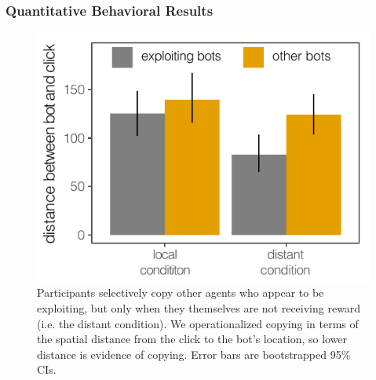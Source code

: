 \documentclass[12pt,letterpaper]{article}
\begin{document}
\subsubsection{Quantitative Behavioral Results}

\begin{figure}
    \centering
    \includegraphics[width=0.8 \linewidth]{figures/proximity.pdf}
    \vspace{-1em}
    \caption{Participants selectively copy other agents who appear to be exploiting, but only when they themselves are not receiving reward (i.e. the distant condition). We operationalized copying in terms of the spatial distance from the click to the bot's location, so lower distance is evidence of copying. Error bars are bootstrapped 95\% CIs. }
    \label{fig:proximity}
\end{figure}
\end{document}
